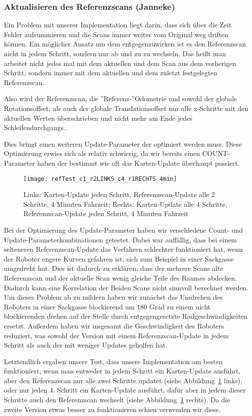 \subsubsection{Aktualisieren des Referenzscans (Janneke)}

Ein Problem mit unserer Implementation liegt darin, dass sich über die Zeit Fehler aufsummieren und die Scans immer weiter vom Original weg driften können. Ein möglicher Ansatz um dem entgegenzuwirken ist es den Referenzscan nicht in jedem Schritt, sondern nur ab und zu zu wechseln. Das heißt man arbeitet nicht jedes mal mit dem aktuellen und dem Scan aus dem vorherigen Schritt, sondern immer mit dem aktuellen und dem zuletzt festgelegten Referenzscan.

Also wird der Referenzscan, die ''Referenz-''Odometrie und sowohl der globale Rotationsoffset, als auch der globale Translationsoffset nur alle x-Schritte mit den aktuellen Werten überschrieben und nicht mehr am Ende jedes Schleifendurchgangs.

Dies bringt einen weiteren Update-Parameter der optimiert werden muss. Diese Optimierung erwies sich als relativ schwierig, da wir bereits einen COUNT-Parameter haben der bestimmt wie oft das Karten-Update überhaupt passiert.

\begin{figure}
	\centering
	\texttt{[image: refTest\_c1\_r2LINKS\_c4\_r1RECHTS\_4min]}
	\caption{Links: Karten-Update jeden Schritt, Referenzscan-Update alle 2 Schritte, 4 Minuten Fahrzeit; Rechts: Karten-Update alle 4 Schritte, Referenzscan-Update jeden Schritt, 4 Minuten Fahrzeit\newline}
	\label{fig:refTest}
\end{figure}

Bei der Optimierung des Update-Parameter haben wir verschiedene Count- und Update-Parameterkombinationen getestet. Dabei war auffällig, dass bei einem selteneren Referenzscan-Update das Verfahren schlechter funktioniert hat, wenn der Roboter engere Kurven gefahren ist, sich zum Beispiel in einer Sackgasse umgedreht hat. Dies ist dadurch zu erklären, dass der mehrere Scans alte Referenzscan und der aktuelle Scan wenig gleiche Teile des Raumes abdecken. Dadurch kann eine Korrelation der Beiden Scans nicht sinnvoll berechnet werden. Um dieses Problem ab zu mildern haben wir zunächst das Umdrehen des Roboters in einer Sackgasse blockierend um 180 Grad zu einem nicht blockierenden drehen auf der Stelle durch entgegengesetzte Radgeschwindigkeiten ersetzt. Außerdem haben wir insgesamt die Geschwindigkeit des Roboters reduziert, was sowohl der Version mit einem Referenzscan-Update in jedem Schritt als auch der mit weniger Updates geholfen hat.

Letztendlich ergaben unsere Test, dass unsere Implementation am besten funktioniert, wenn man entweder in jedem Schritt ein Karten-Update ausführt, aber den Referenzscan nur alle zwei Schritte updatet (siehe Abbildung~\ref{fig:refTest} links), oder nur jeden 4. Schritt ein Karten-Update ausführt, dafür aber in jedem dieser Schritte auch den Referenzscan wechselt (siehe Abbildung~\ref{fig:refTest} rechts). Da die zweite Version etwas besser zu funktionieren schien verwenden wir diese.
